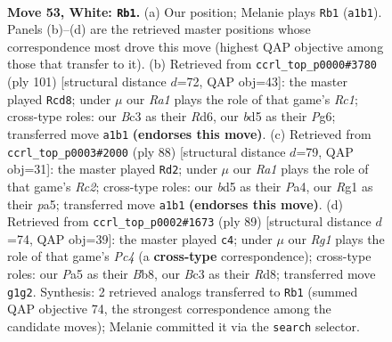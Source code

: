 \documentclass[11pt]{article}
\begin{document}
\clearpage

\begin{figure}[p]\centering
\begin{subfigure}{0.46\textwidth}\centering
\resizebox{\linewidth}{!}{%
\newchessgame
\chessboard[
  setfen={2rk1b1r/6p1/p1p5/Pp1b1p1p/2p2P1P/2B1P1P1/1P5N/R1K3R1 w - - 7 53},
  showmover=false,
  pgfstyle=straightmove, color=movearrow, markmove={a1-b1}
]}
\caption{}
\end{subfigure}\hfill
\begin{subfigure}{0.46\textwidth}\centering
\resizebox{\linewidth}{!}{%
\newchessgame
\chessboard[
  setfen={2r5/4k1b1/3rp1p1/p1p2p1p/7P/1PPP2P1/P1R1BP2/3R1K2 b - - 37 51},
  showmover=false,
  pgfstyle=straightmove, color=movearrow, markmove={c8-d8}
]}
\caption{}
\end{subfigure}
\\[4pt]
\begin{subfigure}{0.46\textwidth}\centering
\resizebox{\linewidth}{!}{%
\newchessgame
\chessboard[
  setfen={8/2r1kp2/1prpp2p/p3b1pP/P1P1P1P1/1P2B3/2R1KP2/1R6 w - - 4 45},
  showmover=false,
  pgfstyle=straightmove, color=movearrow, markmove={c2-d2}
]}
\caption{}
\end{subfigure}\hfill
\begin{subfigure}{0.46\textwidth}\centering
\resizebox{\linewidth}{!}{%
\newchessgame
\chessboard[
  setfen={1b1r4/1p2rpk1/6p1/1PpP1p1p/7P/4P1P1/R2R1PB1/6K1 b - - 0 45},
  showmover=false,
  pgfstyle=straightmove, color=movearrow, markmove={c5-c4}
]}
\caption{}
\end{subfigure}
\caption{\textbf{Move 53, White: \texttt{Rb1}.} (a) Our position; Melanie plays \texttt{Rb1} (\texttt{a1b1}). Panels (b)--(d) are the retrieved master positions whose correspondence most drove this move (highest QAP objective among those that transfer to it). (b) Retrieved from \texttt{ccrl\_top\_p0000\#3780} (ply 101) [structural distance $d$=72, QAP obj=43]: the master played \texttt{Rcd8}; under $\mu$ our \emph{Ra1} plays the role of that game's \emph{Rc1}; cross-type roles: our \emph{B}c3 as their \emph{R}d6, our \emph{b}d5 as their \emph{P}g6; transferred move \texttt{a1b1} \textbf{(endorses this move)}. (c) Retrieved from \texttt{ccrl\_top\_p0003\#2000} (ply 88) [structural distance $d$=79, QAP obj=31]: the master played \texttt{Rd2}; under $\mu$ our \emph{Ra1} plays the role of that game's \emph{Rc2}; cross-type roles: our \emph{b}d5 as their \emph{P}a4, our \emph{R}g1 as their \emph{p}a5; transferred move \texttt{a1b1} \textbf{(endorses this move)}. (d) Retrieved from \texttt{ccrl\_top\_p0002\#1673} (ply 89) [structural distance $d$=74, QAP obj=39]: the master played \texttt{c4}; under $\mu$ our \emph{Rg1} plays the role of that game's \emph{Pc4} (a \textbf{cross-type} correspondence); cross-type roles: our \emph{P}a5 as their \emph{B}b8, our \emph{B}c3 as their \emph{R}d8; transferred move \texttt{g1g2}. Synthesis: 2 retrieved analogs transferred to \texttt{Rb1} (summed QAP objective 74, the strongest correspondence among the candidate moves); Melanie committed it via the \texttt{search} selector.}
\label{fig:thought-m104}
\end{figure}
\end{document}
